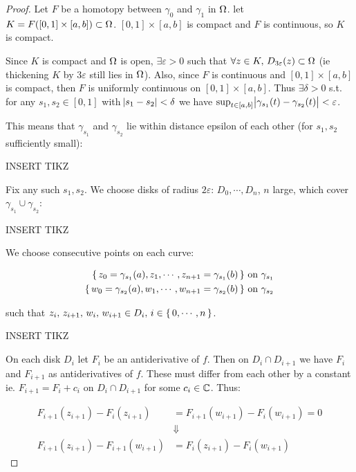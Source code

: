 \begin{proof}
Let $F$ be a homotopy between $\gamma_0$ and $\gamma_1$ in $\Omega$. let $K = F([0,1] \times [a,b]) \subset \Omega$. $[0,1] \times [a,b]$ is compact and $F$ is continuous, so $K$ is compact.

Since $K$ is compact and $\Omega$ is open, $\exists \varepsilon > 0$ such that $\forall z \in K, \, D_{3\varepsilon}(z) \subset \Omega$ (ie thickening $K$ by $3 \varepsilon$ still lies in $\Omega$). Also, since $F$ is continuous and $[0,1] \times [a,b]$ is compact, then $F$ is uniformly continuous on $[0,1] \times [a,b]$. Thus $\exists \delta >0$ s.t. for any $s_1, s_2 \in [0,1]$ with $\abs{s_1-s_2} < \delta$ we have $\sup_{t \in [a,b]} \abs{\gamma_{s_1}(t) - \gamma_{s_2}(t)} < \varepsilon $.



This means that $\gamma_{s_1}$ and $\gamma_{s_2}$ lie within distance epsilon of each other (for $s_1,s_2$ sufficiently small):


INSERT TIKZ


Fix any such $s_1, s_2$. We choose disks of radius $2 \varepsilon$: $D_0, \cdots ,D_n$, $n$ large, which cover $\gamma_{s_1} \cup \gamma_{s_2}$:

INSERT TIKZ




We choose consecutive points on each curve:

\begin{align*}
    \set{z_0 = \gamma_{s_1}(a), z_1, \cdots, z_{n+1} = \gamma_{s_1}(b)  } &\text{ on } \gamma_{s_1}\\
    \set{w_0 = \gamma_{s_2}(a), w_1, \cdots, w_{n+1} = \gamma_{s_2}(b)  } &\text{ on } \gamma_{s_2}\\
\end{align*}

such that $z_i, \, z_{i+1}, \, w_i, \, w_{i+1} \in D_i, \, i \in \set{0, \cdots , n}$.

INSERT TIKZ

On each disk $D_i$ let $F_i$ be an antiderivative of $f$. Then on $D_i \cap D_{i+1}$ we have $F_i$ and $F_{i+1}$ as antiderivatives of $f$. These must differ from each other by a constant ie. $F_{i+1} = F_i + c_i$ on $D_i \cap D_{i+1}$ for some $c_i \in \mathbb{C}$. Thus:

\begin{align*}
    F_{i+1} (z_{i+1} ) - F_i ( z_{i+1}) &= F_{i+1} (w_{i+1}) - F_i ( w_{i+1}) = 0\\
    &\Downarrow\\
     F_{i+1} (z_{i+1} ) -  F_{i+1} (w_{i+1}) &= F_i ( z_{i+1}) - F_i ( w_{i+1})
\end{align*}
 

\end{proof}

